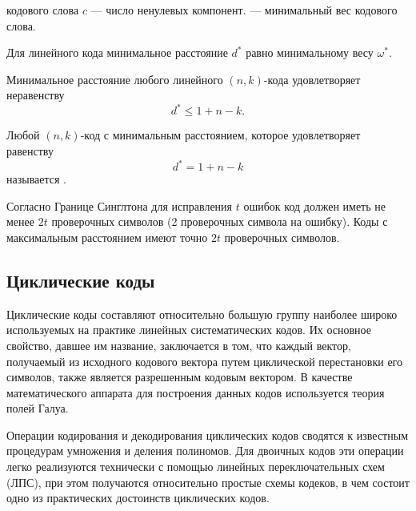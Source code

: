 \begin{definition}  кодового слова $c$ --- число ненулевых компонент.
 --- минимальный вес кодового слова.
\end{definition}

\begin{theorem} 
Для линейного кода минимальное расстояние $d^*$ равно минимальному весу $\omega^*$.
\end{theorem}

\begin{theorem} 
Минимальное расстояние любого линейного $(n, k)$-кода удовлетворяет неравенству $$d^* \leq 1+n-k.$$
\end{theorem}

\begin{definition}
Любой $(n, k)$-код с минимальным расстоянием, которое удовлетворяет равенству $$d^*=1+n-k$$ называется
.
\end{definition}

Согласно Границе Синглтона для исправления $t$ ошибок код должен иметь не менее $2t$ проверочных
символов (2 проверочных символа на ошибку). Коды с максимальным расстоянием имеют точно $2t$
проверочных символов.

\subsection{Циклические коды}
Циклические коды составляют относительно большую группу наиболее широко используемых на 
практике линейных систематических кодов. Их основное свойство, давшее им название, 
заключается в том, что каждый вектор, получаемый из исходного кодового вектора путем 
циклической перестановки его символов, также является разрешенным кодовым вектором.
В качестве математического аппарата для построения данных кодов используется теория полей Галуа.

Операции кодирования и декодирования циклических кодов сводятся к известным процедурам 
умножения и деления полиномов. Для двоичных кодов эти операции легко реализуются 
технически с помощью линейных переключательных схем (ЛПС), при этом получаются 
относительно простые схемы кодеков, в чем состоит одно из практических достоинств циклических кодов.

